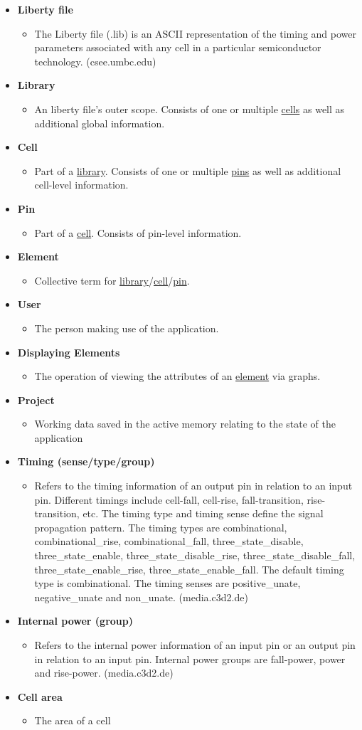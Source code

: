 \documentclass[10pt,a4paper]{report}
\newcommand{\itemglo}[3]{
    \label{glo:#1}\textbf{#2}
    \begin{itemize}[noitemsep, topsep=0pt, label=]
        \item #3
    \end{itemize}
}
\newcommand{\refer}[2]{\hyperref[#1]{\textcolor{col:reference}{#2}}}
\newcommand{\refg}[2]{\refer{glo:#1}{#2}}
\begin{document}
\begin{itemize}[label=]
    \item \itemglo{liberty_file}{Liberty file}{The Liberty file (.lib) is an ASCII representation of the timing and power parameters associated with any cell in a particular semiconductor technology. (csee.umbc.edu)}
    \item \itemglo{library}{Library}
    {An liberty file's outer scope. Consists of one or multiple \refg{cell}{cells} as well as additional global information.}
    \item \itemglo{cell}{Cell}{
    Part of a \refg{library}{library}.
    Consists of one or multiple \refg{pin}{pins} as well as additional cell-level information.}
    \item \itemglo{pin}{Pin}{
    Part of a \refg{cell}{cell}.
    Consists of pin-level information.}
    \item \itemglo{element}{Element}{
    Collective term for \refg{library}{library}/\refg{cell}{cell}/\refg{pin}{pin}.}
    \item \itemglo{user}{User}{
    The person making use of the application.}
    \item \itemglo{display_element}{Displaying Elements}{
    The operation of viewing the attributes of an \refg{element}{element} via graphs.}
    \item \itemglo{project}{Project}{
    Working data saved in the active memory relating to the state of the application}
    \item \itemglo{timing}{Timing (sense/type/group)}{
    Refers to the timing information of an output pin in relation to an input pin. Different timings include cell-fall, cell-rise, fall-transition, rise-transition, etc. The timing type and timing sense define the signal propagation pattern. The timing types are combinational, combinational\_rise, combinational\_fall, three\_state\_disable, three\_state\_enable, three\_state\_disable\_rise, three\_state\_disable\_fall, three\_state\_enable\_rise, three\_state\_enable\_fall. The default timing type is combinational. 
    The timing senses are positive\_unate, negative\_unate and non\_unate. (media.c3d2.de)}
    \item \itemglo{internal_power_group}{Internal power (group)}{
    Refers to the internal power information of an input pin or an output pin in relation to an input pin. Internal power groups are fall-power, power and rise-power. (media.c3d2.de)}
    \item \itemglo{cell_area}{Cell area}{
    The area of a cell}

\end{itemize}
\end{document}
